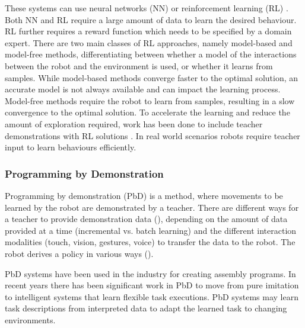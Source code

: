 These systems can use neural networks (NN) \cite{billard2001robust} or reinforcement learning (RL) \cite{smart2002effective}. Both NN and RL require a large amount of data to learn the desired behaviour. 
RL further requires a reward function which needs to be specified by a domain expert.
There are two main classes of RL approaches, namely model-based \cite{polydoros2017survey} and model-free \cite{kober2013reinforcement} methods, differentiating between whether a model of the interactions between the robot and the environment is used, or whether it learns from samples.
While model-based methods converge faster to the optimal solution, an accurate model is not always available and can impact the learning process.
Model-free methods require the robot to learn from samples, resulting in a slow convergence to the optimal solution.
To accelerate the learning and reduce the amount of exploration required, work has been done to include teacher demonstrations with RL solutions \cite{martinez2017relational,hester2017learning}.
In real world scenarios robots require teacher input to learn behaviours efficiently. 
\subsubsection{Programming by Demonstration}
Programming by demonstration (PbD) \cite{billard2008robot} is a method, where movements to be learned by the robot are demonstrated by a teacher. There are different ways for a teacher to provide demonstration data (), depending on the amount of data provided at a time (incremental vs. batch learning) and the different interaction modalities (touch, vision, gestures, voice) to transfer the data to the robot. The robot derives a policy in various ways (). 

PbD systems have been used in the industry for creating assembly programs. In recent years there has been significant work in PbD to move from pure imitation to intelligent systems that learn flexible task executions. PbD systems may learn task descriptions from interpreted data to adapt the learned task to changing environments.

